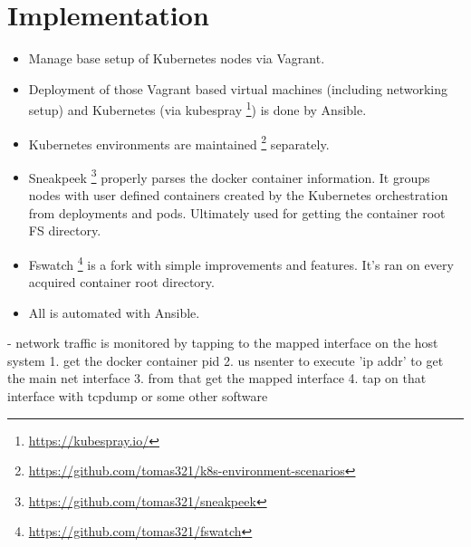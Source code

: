 \chapter{Implementation \label{implementation}}

\begin{itemize}[noitemsep]
	\item 
	Manage base setup of Kubernetes nodes via Vagrant.
	\item 
	Deployment of those Vagrant based virtual machines (including networking setup) and Kubernetes (via kubespray \footnote{\url{https://kubespray.io/}}) is done by Ansible.
	\item 
	Kubernetes environments are maintained \footnote{\url{https://github.com/tomas321/k8s-environment-scenarios}} separately.
	\item
	Sneakpeek \footnote{\url{https://github.com/tomas321/sneakpeek}} properly parses the docker container information. It groups nodes with user defined containers created by the Kubernetes orchestration from deployments and pods. Ultimately used for getting the container root FS directory.
	\item
	Fswatch \footnote{\url{https://github.com/tomas321/fswatch}} is a fork with simple improvements and features. It's ran on every acquired container root directory.
	\item
	All is automated with Ansible.	
	
\end{itemize}

- network traffic is monitored by tapping to the mapped interface on the host system
1. get the docker container pid
2. us nsenter to execute 'ip addr' to get the main net interface
3. from that get the mapped interface 
4. tap on that interface with tcpdump or some other software